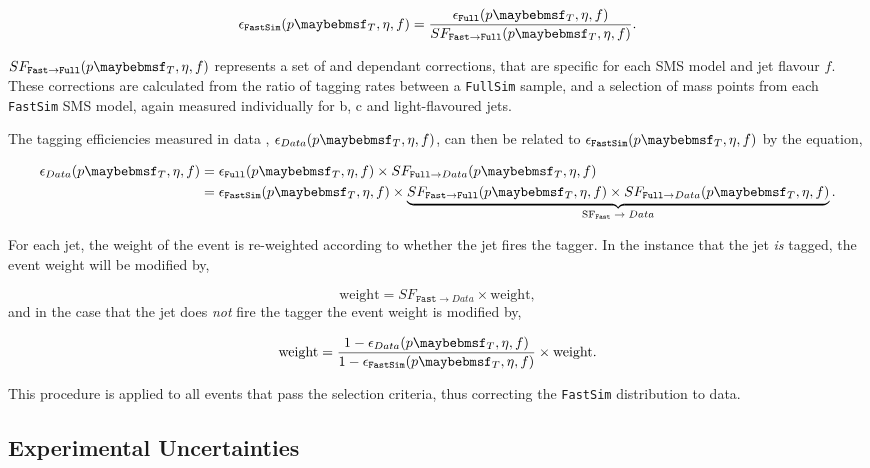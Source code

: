 \begin{equation}
\epsilon_{\texttt{FastSim}}(\pt,\eta,f) =  \frac{\epsilon_{\texttt{Full}}(\pt,\eta,f)}{SF_{\texttt{Fast}\rightarrow\texttt{Full}}(\pt,\eta,f)}.
\end{equation}

$SF_{\texttt{Fast}\rightarrow\texttt{Full}}(\pt,\eta,f)$ represents a set of \pt and \eta dependant corrections, that are specific for each \ac{SMS} model and jet flavour $f$. These corrections are calculated from the ratio of tagging rates between a \texttt{FullSim} \ttbar sample, and a selection of mass points from each \texttt{FastSim} \ac{SMS} model, again measured individually for b, c and light-flavoured jets. 

The tagging efficiencies measured in data \cite{btagscalefactor}, $\epsilon_{Data}(\pt,\eta,f)$,  can then be related to $\epsilon_{\texttt{FastSim}}(\pt,\eta,f)$ by the equation,

\begin{align}
\epsilon_{Data}(\pt,\eta,f) &=  \epsilon_{\texttt{Full}}(\pt,\eta,f) \times SF_{\texttt{Full}\rightarrow Data}(\pt,\eta,f) \nonumber \\
&=  \epsilon_{\texttt{FastSim}}(\pt,\eta,f) \times \underbrace{SF_{\texttt{Fast}\rightarrow\texttt{Full}}(\pt,\eta,f) \times SF_{\texttt{Full}\rightarrow Data}(\pt,\eta,f)}_\text{SF$_{\texttt{Fast}} \rightarrow Data$}.
\end{align}

For each jet, the weight of the event is re-weighted according to whether the jet fires the tagger. In the instance that the jet \emph{is} tagged, the event weight will be modified by,

\begin{equation}
\text{weight} = SF_{\texttt{Fast} \rightarrow Data} \times \text{weight},
\end{equation} 
and in the case that the jet does \emph{not} fire the tagger the event weight is modified by,

\begin{equation}
\text{weight} = \frac{1-\epsilon_{Data}(\pt,\eta,f)}{1- \epsilon_{\texttt{FastSim}}(\pt,\eta,f)}\times \text{weight}.
\end{equation}

This procedure is applied to all events that pass the selection criteria, thus correcting the \texttt{FastSim} \nbreco distribution to data. 

\subsection{Experimental Uncertainties}

